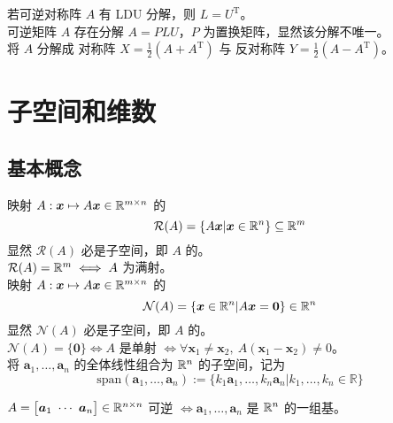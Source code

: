 \documentclass[./main.tex]{subfiles}
\begin{document}
若可逆对称阵 $A$ 有 LDU 分解，则 $L=U^{\mathrm{T}}$。\\

可逆矩阵 $A$ 存在分解 $A=PLU$，$P$ 为置换矩阵，显然该分解不唯一。\\

将 $A$ 分解成 对称阵 $X=\frac{1}{2}(A+A^{\mathrm{T}})$ 与 反对称阵 $Y=\frac{1}{2}(A-A^{\mathrm{T}})$。

\section{子空间和维数}

\subsection{基本概念}

映射 $A:\bm{x}\mapsto A\bm{x}\in\mathbb{R}^{m\times n}$ 的
\begin{equation}
    \mathcal{R}(A)=\{A\bm{x}|\bm{x}\in\mathbb{R}^{n}\}\subseteq\mathbb{R}^{m}
\end{equation}
显然 $\mathcal{R}(A)$ 必是子空间，即 $A$ 的。\\

 $\mathcal{R}(A)=\mathbb{R}^{m}\iff A$ 为满射。\\

映射 $A:\bm{x}\mapsto A\bm{x}\in\mathbb{R}^{m\times n}$ 的
\begin{equation}
    \mathcal{N}(A)=\{\bm{x}\in\mathbb{R}^{n}|A\bm{x}=\bm{0}\}\in\mathbb{R}^{n}
\end{equation}
显然 $\mathcal{N}(A)$ 必是子空间，即 $A$ 的。\\

 $\mathcal{N}(A)=\{\bm{0}\}\iff A$ 是单射 $\iff \forall\bm{x}_1\neq\bm{x}_2,\ A(\bm{x}_1-\bm{x}_2)\neq 0$。\\

将 $\bm{a}_1,\dots,\bm{a}_n$ 的全体线性组合为 $\mathbb{R}^{n}$ 的子空间，记为
\begin{equation}
    \mathrm{span}(\bm{a}_1,\dots,\bm{a}_n):=\{k_1\bm{a}_1,\dots,k_n\bm{a}_n|k_1,\dots,k_n\in\mathbb{R}\}
\end{equation}

$A=\big[\bm{a}_1\ \cdots\ \bm{a}_n\big]\in\linsp{n\times n}$ 可逆 $\iff \bm{a}_1,\dots,\bm{a}_n$ 是 $\mathbb{R}^{n}$ 的一组基。
\end{document}
